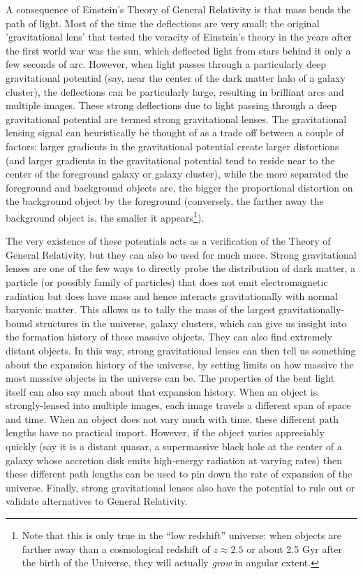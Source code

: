 \documentclass[10pt,twocolumn,letterpaper]{article}
\begin{document}
A consequence of Einstein's Theory of General Relativity is that mass bends the
path of light. \cite{Einstein:2007aa} Most of the time the deflections are very
small; the original 'gravitational lens' that tested the veracity of Einstein's
theory in the years after the first world war was the sun, which deflected
light from stars behind it only a few seconds of arc. However, when light
passes through a particularly deep gravitational potential (say, near the
center of the dark matter halo of a galaxy cluster), the deflections can be
particularly large, resulting in brilliant arcs and multiple images. These
strong deflections due to light passing through a deep gravitational potential
are termed strong gravitational lenses. The gravitational lensing signal can
heuristically be thought of as a trade off between a couple of factors: larger
gradients in the gravitational potential create larger distortions (and larger
gradients in the gravitational potential tend to reside near to the center of
the foreground galaxy or galaxy cluster), while the more separated the foreground and
background objects are, the bigger the proportional distortion on the
background object by the foreground (conversely, the farther away the background object
is, the smaller it appears\footnote{Note that this is only true in the ``low
  redshift'' universe: when objects are farther away than a cosmological
redshift of $z \approx 2.5$ or about 2.5 Gyr after the birth of the Universe,
they will actually \textit{grow} in angular extent.}). \cite{Kochanek:2006oz}

The very existence of these potentials acts as a verification of the Theory of
General Relativity, but they can also be used for much more. Strong
gravitational lenses are one of the few ways to directly probe the distribution
of dark matter, a particle (or possibly family of particles) that does not emit
electromagnetic radiation but does have mass and hence interacts
gravitationally with normal baryonic matter. \cite{Refsdal:1964aa} This allows
us to tally the mass of the largest gravitationally-bound structures in the
universe, galaxy clusters, which can give us insight into the formation history
of these massive objects. \cite{Oguri:2010aa} They can also find extremely
distant objects. \cite{Hezaveh:2014aa} In this way, strong gravitational lenses
can then tell us something about the expansion history of the universe, by
setting limits on how massive the most massive objects in the universe can be.
The properties of the bent light itself can also say much about that expansion
history. \cite{Refsdal:1964ab, Kundic:1997aa, Gonzalez:2012aa, Barnacka:2014aa,
Hojjati:2014aa, Suyu:2014aa} When an object is strongly-lensed into multiple
images, each image travels a different span of space and time. When an object
does not vary much with time, these different path lengths have no practical
import. However, if the object varies appreciably quickly (say it is a distant
quasar, a supermassive black hole at the center of a galaxy whose accretion
disk emits high-energy radiation at varying rates) then these different path
lengths can be used to pin down the rate of expansion of the universe. Finally,
strong gravitational lenses also have the potential to rule out or validate
alternatives to General Relativity. \cite{Troxel:2014aa}
\end{document}

